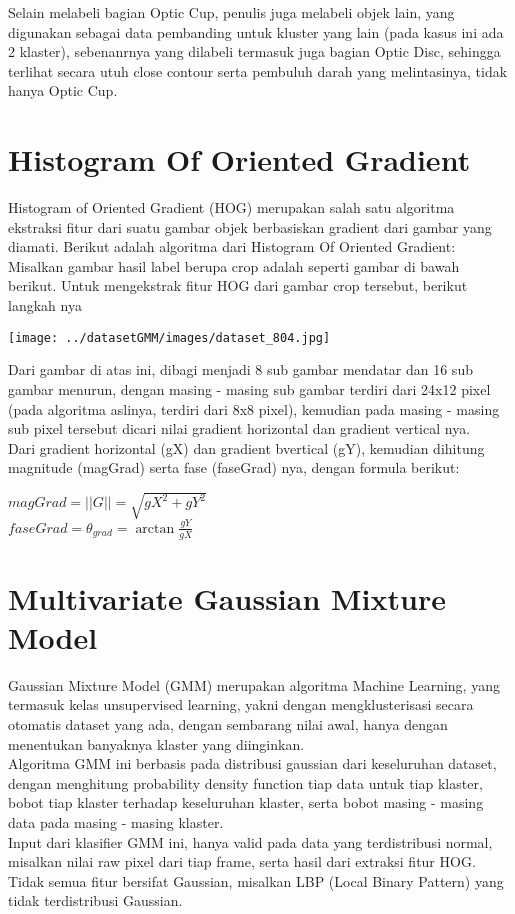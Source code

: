 \documentclass[]{IEEEphot}
\begin{document}
\noindent Selain melabeli bagian Optic Cup, penulis juga melabeli objek lain, yang digunakan sebagai data pembanding untuk kluster yang lain (pada kasus ini ada 2 klaster), sebenanrnya yang dilabeli termasuk juga bagian Optic Disc, sehingga terlihat secara utuh close contour serta pembuluh darah yang melintasinya, tidak hanya Optic Cup.
\section{Histogram Of Oriented Gradient}
Histogram of Oriented Gradient (HOG) merupakan salah satu algoritma ekstraksi fitur dari suatu gambar objek berbasiskan gradient dari gambar yang diamati. Berikut adalah algoritma dari Histogram Of Oriented Gradient:\\
Misalkan gambar hasil label berupa crop adalah seperti gambar di bawah berikut. Untuk mengekstrak fitur HOG dari gambar crop tersebut, berikut langkah nya

\begin{center}
\texttt{[image: ../datasetGMM/images/dataset\_804.jpg]}
\end{center}

\noindent Dari gambar di atas ini, dibagi menjadi 8 sub gambar mendatar dan 16 sub gambar menurun, dengan masing - masing sub gambar terdiri dari 24x12 pixel (pada algoritma aslinya, terdiri dari 8x8 pixel), kemudian pada masing - masing sub pixel tersebut dicari nilai gradient horizontal dan gradient vertical nya.\\

\noindent Dari gradient horizontal (gX) dan gradient bvertical (gY), kemudian dihitung magnitude (magGrad) serta fase (faseGrad) nya, dengan formula berikut:
\begin{center}
$magGrad = ||G|| = \sqrt{gX^2 + gY^2}$\\
$faseGrad = \theta_{grad}  = \arctan{\frac{gY}{gX}}$
\end{center}

\section{Multivariate Gaussian Mixture Model}
Gaussian Mixture Model (GMM) merupakan algoritma Machine Learning, yang termasuk kelas unsupervised learning, yakni dengan mengklusterisasi secara otomatis dataset yang ada, dengan sembarang nilai awal, hanya dengan menentukan banyaknya klaster yang diinginkan.\\
Algoritma GMM ini berbasis pada distribusi gaussian dari keseluruhan dataset, dengan menghitung probability density function tiap data untuk tiap klaster, bobot tiap klaster terhadap keseluruhan klaster, serta bobot masing - masing data pada masing - masing klaster.\\
Input dari klasifier GMM ini, hanya valid pada data yang terdistribusi normal, misalkan nilai raw pixel dari tiap frame, serta hasil dari extraksi fitur HOG. Tidak semua fitur bersifat Gaussian, misalkan LBP (Local Binary Pattern) yang tidak terdistribusi Gaussian.\\
\end{document}
